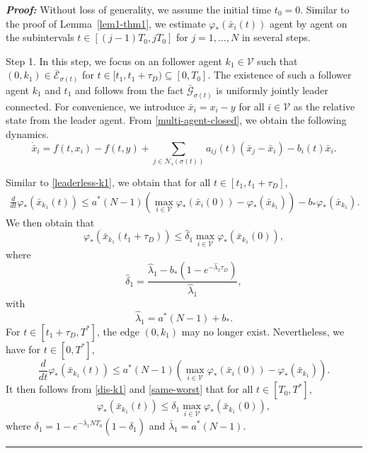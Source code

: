\documentclass[a4paper, 11pt]{article}
\newenvironment{IEEEproof}[1][\bf Proof]{\smallskip\par\noindent\textit{#1: }}{\hspace*{\fill} \rule{6pt}{6pt}\smallskip}
\begin{document}
\begin{IEEEproof}
Without loss of generality, we assume the initial time $t_0=0$.
Similar to the proof of Lemma~\ref{lem1-thm1}, we estimate $\varphi_*(\bar{x}_i(t))$ agent by agent on the subintervals $t \in [(j-1)T_0, jT_0]$ for $j=1,\ldots,N$ in several steps.

\noindent Step 1. In this step, we focus on an follower agent $k_1 \in \mathcal{V}$ such that
$(0,k_1) \in \bar{\mathcal{E}}_{\sigma(t)}$ for $t \in [t_1,t_1+\tau_D) \subseteq [0,T_0]$.
The existence of such a follower agent $k_1$ and $t_1$ and follows from the fact
$\bar{\mathcal{G}}_{\sigma(t)}$ is uniformly jointly leader connected. 
For convenience, we introduce $\bar{x}_i=x_i-y$ for all $i \in \mathcal{V}$ as the relative state from the leader agent.
From \eqref{multi-agent-closed}, we obtain the following dynamics.
\begin{equation}\label{dynamics-relative}
\dot{\bar{x}}_i=f(t,x_i)-f(t,y)+ \sum _{j \in \mathcal{N}_i(\sigma(t))} a_{ij}(t)(\bar{x}_j-\bar{x}_i)-b_{i}(t)\bar{x}_i.
\end{equation}

Similar to \eqref{leaderless-k1}, we obtain that for all $t \in [t_1, t_1+\tau_D]$,
\begin{align*}
\frac{d}{dt} \varphi_*(\bar{x}_{k_1}(t))\leq a^* (N-1)\left(\max_{i \in \mathcal{V}}\varphi_*(\bar{x}_i(0))-\varphi_*(\bar{x}_{k_1})\right)-b_* \varphi_*(\bar{x}_{k_1}).
\end{align*}
We then obtain that \begin{equation}\label{dis-k1}
\varphi_*(\bar{x}_{k_1}(t_1+\tau_D)) \leq \hat{\delta}_1 \max_{i \in \mathcal{V}}\varphi_*(\bar{x}_{k_1}(0)),
\end{equation}
where
\begin{equation}\label{hatdelta1}
\hat{\delta}_1=\frac{\hat{\lambda}_1-b_*(1- e^{-\hat{\lambda}_1\tau_D})}{\hat{\lambda}_1},
\end{equation}
with
\begin{equation}\label{def-lambda1hat}
\hat{\lambda}_1=a^*(N-1)+b_*.
\end{equation}
For $t \in [t_1+\tau_D, T^*]$, the edge $(0,k_1)$ may no longer exist.
Nevertheless, we have for $t \in [0, T^*]$,
\begin{equation}
\frac{d}{dt}  \varphi_*(\bar{x}_{k_1}(t)) \leq a^* (N-1)\left(\max_{i \in \mathcal{V}}\varphi_*(\bar{x}_i(0))-\varphi_*(\bar{x}_{k_1})\right). \label{same-worst}
\end{equation}
It then follows from \eqref{dis-k1} and \eqref{same-worst} that
for all $t \in [T_0, T^*]$,
\begin{equation}\label{vk1}
\varphi_*(\bar{x}_{k_1}(t))  \leq \delta_1 \max_{i \in \mathcal{V}}\varphi_*(\bar{x}_{k_1}(0)),
\end{equation}
where $\delta_1 = 1-e^{-\bar{\lambda}_1 N T_0}(1-\hat{\delta}_1)$ and
$\bar{\lambda}_1=a^* (N-1)$.


\end{IEEEproof}
\end{document}
